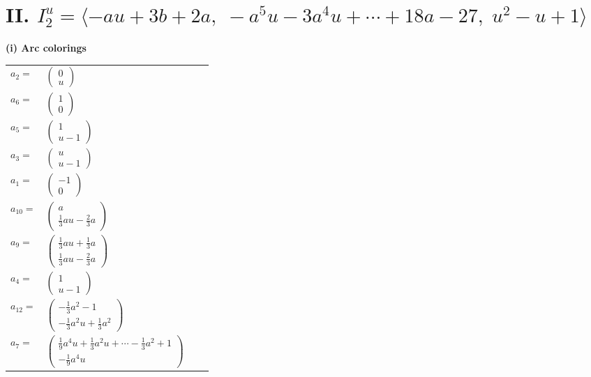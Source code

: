 \documentclass[1p]{elsarticle_modified}
\theoremstyle{definition}
\begin{document}
\centering \section*{II. $I^u_{2}= \langle - a u+3 b+2 a,\;- a^5 u-3 a^4 u+\cdots+18 a-27,\;u^2- u+1 \rangle$}
\flushleft \textbf{(i) Arc colorings}\\
\begin{tabular}{m{7pt} m{180pt} m{7pt} m{180pt} }
\flushright $a_{2}=$&$\begin{pmatrix}0\\u\end{pmatrix}$ \\
\flushright $a_{6}=$&$\begin{pmatrix}1\\0\end{pmatrix}$ \\
\flushright $a_{5}=$&$\begin{pmatrix}1\\u-1\end{pmatrix}$ \\
\flushright $a_{3}=$&$\begin{pmatrix}u\\u-1\end{pmatrix}$ \\
\flushright $a_{1}=$&$\begin{pmatrix}-1\\0\end{pmatrix}$ \\
\flushright $a_{10}=$&$\begin{pmatrix}a\\\frac{1}{3} a u-\frac{2}{3} a\end{pmatrix}$ \\
\flushright $a_{9}=$&$\begin{pmatrix}\frac{1}{3} a u+\frac{1}{3} a\\\frac{1}{3} a u-\frac{2}{3} a\end{pmatrix}$ \\
\flushright $a_{4}=$&$\begin{pmatrix}1\\u-1\end{pmatrix}$ \\
\flushright $a_{12}=$&$\begin{pmatrix}-\frac{1}{3} a^2-1\\-\frac{1}{3} a^2 u+\frac{1}{3} a^2\end{pmatrix}$ \\
\flushright $a_{7}=$&$\begin{pmatrix}\frac{1}{9} a^4 u+\frac{1}{3} a^2 u+\cdots-\frac{1}{3} a^2+1\\-\frac{1}{9} a^4 u\end{pmatrix}$ \\

\end{tabular}
\end{document}
